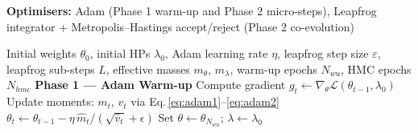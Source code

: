 \documentclass[11pt]{article}
\begin{document}
\begin{algorithm}[H]
\caption{Method A — Hamiltonian HMC Training (HHD)}
\label{alg:hhd}
\textbf{Optimisers:} Adam (Phase 1 warm-up and Phase 2 micro-steps),
Leapfrog integrator + Metropolis--Hastings accept/reject (Phase 2 co-evolution)
\begin{algorithmic}[1]
\Require Initial weights $\theta_0$, initial HPs $\lambda_0$,
         Adam learning rate $\eta$,
         leapfrog step size $\varepsilon$,
         leapfrog sub-steps $L$,
         effective masses $m_\theta$, $m_\lambda$,
         warm-up epochs $N_{wu}$,
         HMC epochs $N_{hmc}$
\State \textbf{Phase 1 — Adam Warm-up}
  \State Compute gradient $g_t \leftarrow \nabla_\theta\mathcal{L}(\theta_{t-1}, \lambda_0)$
  \State Update moments: $m_t$, $v_t$ via Eq.\,\eqref{eq:adam1}--\eqref{eq:adam2}
  \State $\theta_t \leftarrow \theta_{t-1} - \eta\,\hat{m}_t / (\sqrt{\hat{v}_t} + \epsilon)$
\EndFor
\State Set $\theta \leftarrow \theta_{N_{wu}}$; $\lambda \leftarrow \lambda_0$


\end{algorithmic}
\end{algorithm}
\end{document}
